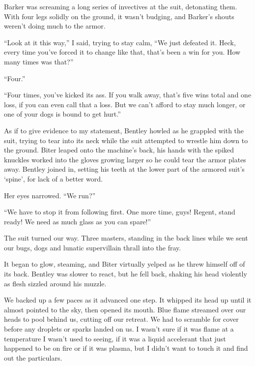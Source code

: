Barker was screaming a long series of invectives at the suit, detonating them.  With four legs solidly on the ground, it wasn't budging, and Barker's shouts weren't doing much to the armor.



``Look at it this way,'' I said, trying to stay calm,  ``We just defeated it.  Heck, every time you've forced it to change like that, that's been a win for you.  How many times was that?''



``Four.''



``Four times, you've kicked its ass.  If you walk away, that's five wins total and one loss, if you can even call that a loss.  But we can't afford to stay much longer, or one of your dogs is bound to get hurt.''



As if to give evidence to my statement, Bentley howled as he grappled with the suit, trying to tear into its neck while the suit attempted to wrestle him down to the ground.  Biter leaped onto the machine's back, his hands with the spiked knuckles worked into the gloves growing larger so he could tear the armor plates away.  Bentley joined in, setting his teeth at the lower part of the armored suit's `spine', for lack of a better word.



Her eyes narrowed.  ``We run?''



``We have to stop it from following first.  One more time, guys!  Regent, stand ready!  We need as much glass as you can spare!''



The suit turned our way.  Three masters, standing in the back lines while we sent our bugs, dogs and lunatic supervillain thrall into the fray.



It began to glow, steaming, and Biter virtually yelped as he threw himself off of its back.  Bentley was slower to react, but he fell back, shaking his head violently as flesh sizzled around his muzzle.



We backed up a few paces as it advanced one step.  It whipped its head up until it almost pointed to the sky, then opened its mouth.  Blue flame streamed over our heads to pool behind us, cutting off our retreat.  We had to scramble for cover before any droplets or sparks landed on us.  I wasn't sure if it was flame at a temperature I wasn't used to seeing, if it was a liquid accelerant that just happened to be on fire or if it was plasma, but I didn't want to touch it and find out the particulars.



